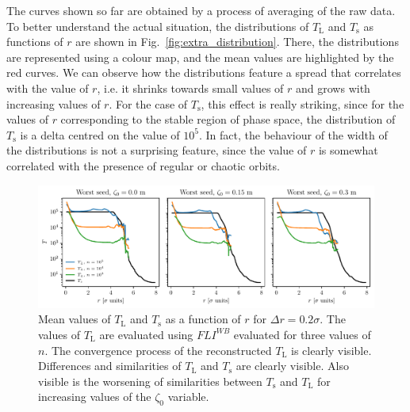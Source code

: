 The curves shown so far are obtained by a process of averaging of the raw data. To better understand the actual situation, the distributions of $T_\mathrm{L}$ and $T_\mathrm{s}$ as functions of $r$ are shown in Fig.~\ref{fig:extra_distribution}. There, the distributions are represented using a colour map, and the mean values are highlighted by the red curves. We can observe how the distributions feature a spread that correlates with the value of $r$, i.e. it shrinks towards small values of $r$ and grows with increasing values of $r$. For the case of $T_\mathrm{s}$, this effect is really striking, since for the values of $r$ corresponding to the stable region of phase space, the distribution of $T_\mathrm{s}$ is a delta centred on the value of $10^5$. In fact, the behaviour of the width of the distributions is not a surprising feature, since the value of $r$ is somewhat correlated with the presence of regular or chaotic orbits. 

\begin{figure}
    \centering
    \includegraphics[width=1\textwidth]{6_lhc_dynamic_indicators/figs/updated/lyapunov_time_vs_radius.pdf}
    \caption{Mean values of $T_\mathrm{L}$ and $T_\mathrm{s}$ as a function of $r$ for $\Delta r = 0.2\sigma$. The values of $T_\mathrm{L}$ are evaluated using $FLI^{{WB}}$ evaluated for three values of $n$. The convergence process of the reconstructed $T_\mathrm{L}$ is clearly visible. Differences and similarities of $T_\mathrm{L}$ and $T_\mathrm{s}$ are clearly visible. Also visible is the worsening of similarities between $T_\mathrm{s}$ and $T_\mathrm{L}$ for increasing values of the $\zeta_0$ variable. }
    \label{fig:ts_vs_tl}
\end{figure}

